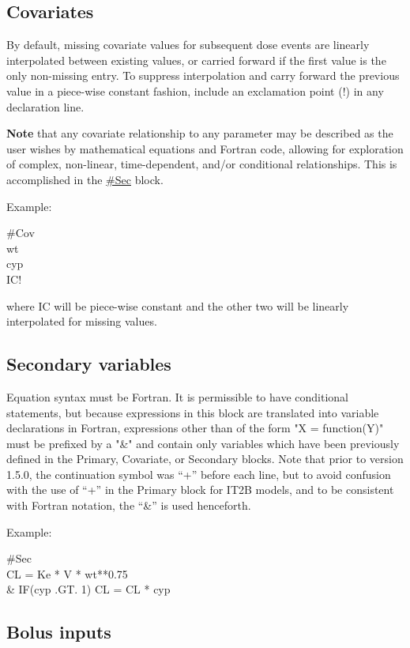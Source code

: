 \documentclass[
]{book}
\begin{document}
\hypertarget{cov}{%
\subsection{Covariates}\label{cov}}

By default, missing covariate values for subsequent dose events are
linearly interpolated between existing values, or carried forward if the
first value is the only non-missing entry. To suppress interpolation and
carry forward the previous value in a piece-wise constant fashion,
include an exclamation point (!) in any declaration line.

\textbf{Note} that any covariate relationship to any parameter may be
described as the user wishes by mathematical equations and Fortran code,
allowing for exploration of complex, non-linear, time-dependent, and/or
conditional relationships. This is accomplished in the \protect\hyperlink{sec}{\#Sec} block.

Example:

\#Cov\\
wt\\
cyp\\
IC!

where IC will be piece-wise constant and the other two will be linearly
interpolated for missing values.

\hypertarget{sec}{%
\subsection{Secondary variables}\label{sec}}

Equation syntax must be Fortran. It is permissible to have conditional
statements, but because expressions in this block are translated into
variable declarations in Fortran, expressions other than of the form "X
= function(Y)" must be prefixed by a "\&" and contain only variables
which have been previously defined in the Primary, Covariate, or
Secondary blocks. Note that prior to version 1.5.0, the continuation
symbol was ``+'' before each line, but to avoid confusion with the use of
``+'' in the Primary block for IT2B models, and to be consistent with
Fortran notation, the ``\&'' is used henceforth.

Example:

\#Sec\\
CL = Ke * V * wt**0.75\\
\& IF(cyp .GT. 1) CL = CL * cyp

\hypertarget{bol}{%
\subsection{Bolus inputs}\label{bol}}
\end{document}
